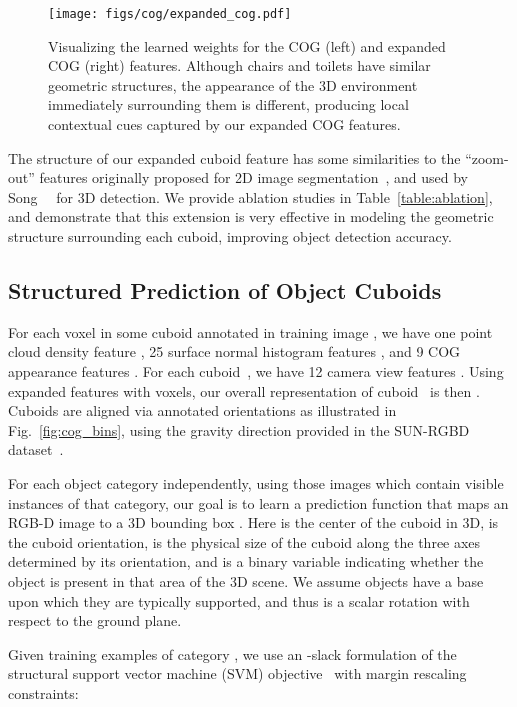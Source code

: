 \begin{figure}[b]
\centering
\texttt{[image: figs/cog/expanded\_cog.pdf]}
  \caption{Visualizing the learned weights for the COG (left) and expanded COG (right) features. Although chairs and toilets have similar geometric structures, the appearance of the 3D environment immediately surrounding them is different, producing local contextual cues captured by our expanded COG features.}
   \label{fig:expanded_cog}
\end{figure}


The structure of our expanded cuboid feature has some similarities to the ``zoom-out'' features originally proposed for 2D image segmentation~\cite{mostajabi2015feedforward}, and used by Song~\etal~\cite{song2016deep} for 3D detection. We provide ablation studies in Table~\ref{table:ablation}, and demonstrate that this extension is very effective in modeling the geometric structure surrounding each cuboid, improving object detection accuracy.



\subsection{Structured Prediction of Object Cuboids}
\label{sec:ssvm}
For each voxel  in some cuboid  annotated in training image , we have one point cloud density feature , 25 surface normal histogram features , and 9 COG appearance features . For each cuboid~, we have 12 camera view features . Using expanded features with  voxels, our overall representation of cuboid~ is then
. 
Cuboids are aligned via annotated orientations as illustrated in Fig.~\ref{fig:cog_bins},
using the gravity direction provided in the SUN-RGBD dataset~\cite{song2015sun}. 

For each object category  independently, using those images which contain visible instances of that category, our goal is to learn a prediction function 
 that maps an RGB-D image  to a 3D bounding box
.  Here  is the center of the cuboid in 3D,  is the cuboid orientation,  is the physical size of the cuboid along the three axes determined by its orientation, and  is a binary variable indicating whether the object is present in that area of the 3D scene. We assume objects have a base upon which they are typically supported, and thus  is a scalar rotation with respect to the ground plane. 

Given  training examples of category , we use an -slack formulation of the structural support vector machine (SVM) objective~\cite{joachims2009cutting} with margin rescaling constraints:

